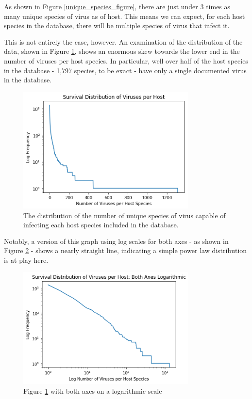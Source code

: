 \documentclass[12pt]{article}
\begin{document}
    As shown in Figure \ref{unique_species_figure}, there are just under 3
    times as many unique species of virus as of host. This means we can expect,
    for each host species in the database, there will be multiple species of virus
    that infect it.

    This is not entirely the case, however. An examination of the distribution of
    the data, shown in Figure \ref{viruses_per_host_figure}, shows an enormous skew
    towards the lower end in the number of viruses per host species. In particular,
    well over half of the host species in the database - 1,797 species, to be exact -
    have only a single documented virus in the database.
    
    \begin{figure}[H]
        \begin{center}
            \includegraphics[width=90mm]{viruses_per_host_figure.png}
            \caption{The distribution of the number of unique species of virus
            capable of infecting each host species included in the database.}
            \label {viruses_per_host_figure}
        \end{center}
    \end{figure}

    Notably, a version of this graph using log scales for both axes - as shown in
    Figure \ref{log_viruses_per_host_figure} - shows a nearly straight line,
    indicating a simple power law distribution is at play here.

    \begin{figure}[H]
        \begin{center}
            \includegraphics[width=90mm]{log_viruses_per_host_figure.png}
            \caption{Figure \ref{viruses_per_host_figure} with both axes on a
            logarithmic scale}
            \label{log_viruses_per_host_figure}
        \end{center}
    \end{figure}
\end{document}
